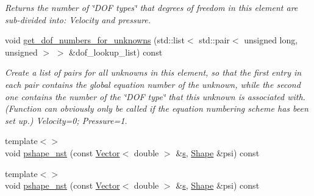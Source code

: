 \begin{DoxyCompactItemize}
\begin{DoxyCompactList}\small\item\em Returns the number of \char`\"{}\+D\+O\+F types\char`\"{} that degrees of freedom in this element are sub-\/divided into\+: Velocity and pressure. \end{DoxyCompactList}\item 
void \hyperlink{classoomph_1_1GeneralisedNewtonianQTaylorHoodElement_ab88a4e14c48864239def0f2ae164528e}{get\+\_\+dof\+\_\+numbers\+\_\+for\+\_\+unknowns} (std\+::list$<$ std\+::pair$<$ unsigned long, unsigned $>$ $>$ \&dof\+\_\+lookup\+\_\+list) const
\begin{DoxyCompactList}\small\item\em Create a list of pairs for all unknowns in this element, so that the first entry in each pair contains the global equation number of the unknown, while the second one contains the number of the \char`\"{}\+D\+O\+F type\char`\"{} that this unknown is associated with. (Function can obviously only be called if the equation numbering scheme has been set up.) Velocity=0; Pressure=1. \end{DoxyCompactList}\item 
{\footnotesize template$<$$>$ }\\void \hyperlink{classoomph_1_1GeneralisedNewtonianQTaylorHoodElement_a4f55aebc396535f04ebdc2dce8e45ff0}{pshape\+\_\+nst} (const \hyperlink{classoomph_1_1Vector}{Vector}$<$ double $>$ \&\hyperlink{cfortran_8h_ab7123126e4885ef647dd9c6e3807a21c}{s}, \hyperlink{classoomph_1_1Shape}{Shape} \&psi) const
\item 
{\footnotesize template$<$$>$ }\\void \hyperlink{classoomph_1_1GeneralisedNewtonianQTaylorHoodElement_aafeab4cbc9e3a7873959357b98fe475c}{pshape\+\_\+nst} (const \hyperlink{classoomph_1_1Vector}{Vector}$<$ double $>$ \&\hyperlink{cfortran_8h_ab7123126e4885ef647dd9c6e3807a21c}{s}, \hyperlink{classoomph_1_1Shape}{Shape} \&psi) const
\end{DoxyCompactItemize}
